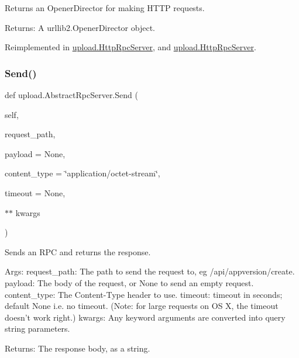 \begin{DoxyVerb}Returns an OpenerDirector for making HTTP requests.

Returns:
  A urllib2.OpenerDirector object.
\end{DoxyVerb}
 

Reimplemented in \mbox{\hyperlink{classupload_1_1_http_rpc_server_a4685030df704ec17f020c8790108a05a}{upload.\+Http\+Rpc\+Server}}, and \mbox{\hyperlink{classupload_1_1_http_rpc_server_a4685030df704ec17f020c8790108a05a}{upload.\+Http\+Rpc\+Server}}.

\mbox{\label{classupload_1_1_abstract_rpc_server_ad6555ae8993a52035191f8572762e741}} 
\subsubsection{\texorpdfstring{Send()}{Send()}\hspace{0.1cm}{\footnotesize\ttfamily [1/2]}}
{\footnotesize\ttfamily def upload.\+Abstract\+Rpc\+Server.\+Send (\begin{DoxyParamCaption}\item[{}]{self,  }\item[{}]{request\+\_\+path,  }\item[{}]{payload = {\ttfamily None},  }\item[{}]{content\+\_\+type = {\ttfamily \char`\"{}application/octet-\/stream\char`\"{}},  }\item[{}]{timeout = {\ttfamily None},  }\item[{$\ast$$\ast$}]{kwargs }\end{DoxyParamCaption})}

\begin{DoxyVerb}Sends an RPC and returns the response.

Args:
  request_path: The path to send the request to, eg /api/appversion/create.
  payload: The body of the request, or None to send an empty request.
  content_type: The Content-Type header to use.
  timeout: timeout in seconds; default None i.e. no timeout.
(Note: for large requests on OS X, the timeout doesn't work right.)
  kwargs: Any keyword arguments are converted into query string parameters.

Returns:
  The response body, as a string.
\end{DoxyVerb}
 \mbox{\label{classupload_1_1_abstract_rpc_server_ad6555ae8993a52035191f8572762e741}} 
